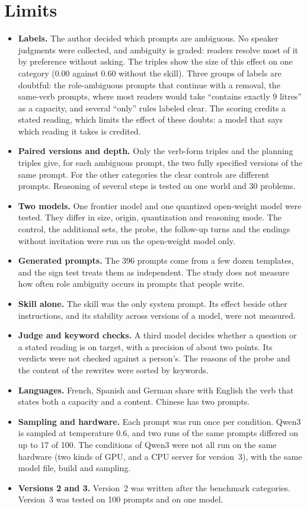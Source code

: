 \documentclass[11pt,a4paper]{article}
\begin{document}
\section{Limits}
\label{sec:limits}

\begin{itemize}\setlength\itemsep{2pt}
\item \textbf{Labels.} The author decided which prompts are ambiguous. No
speaker judgments were collected, and ambiguity is graded: readers resolve
most of it by preference without asking. The triples show the size of
this effect on one category (0.00 against 0.60 without the skill). Three
groups of labels are doubtful: the role-ambiguous prompts that continue
with a removal, the same-verb prompts, where most readers would take
``contains exactly 9 litres'' as a capacity, and several ``only'' rules
labeled clear. The scoring credits a stated reading, which limits the
effect of these doubts: a model that says which reading it takes is
credited.
\item \textbf{Paired versions and depth.} Only the verb-form triples and
the planning triples give, for each ambiguous prompt, the two fully
specified versions of the same prompt. For the other categories the clear
controls are different prompts. Reasoning of several steps is tested on
one world and 30 problems.
\item \textbf{Two models.} One frontier model and one quantized open-weight
model were tested. They differ in size, origin, quantization and
reasoning mode. The control, the additional sets, the probe, the
follow-up turns and the endings without invitation were run on the
open-weight model only.
\item \textbf{Generated prompts.} The 396 prompts come from a few dozen
templates, and the sign test treats them as independent. The study does
not measure how often role ambiguity occurs in prompts that people write.
\item \textbf{Skill alone.} The skill was the only system prompt. Its
effect beside other instructions, and its stability across versions of a
model, were not measured.
\item \textbf{Judge and keyword checks.} A third model decides whether a
question or a stated reading is on target, with a precision of about two
points. Its verdicts were not checked against a person's. The reasons of
the probe and the content of the rewrites were sorted by keywords.
\item \textbf{Languages.} French, Spanish and German share with English
the verb that states both a capacity and a content. Chinese has two
prompts.
\item \textbf{Sampling and hardware.} Each prompt was run once per
condition. Qwen3 is sampled at temperature 0.6, and two runs of the same
prompts differed on up to 17 of 100. The conditions of Qwen3 were not
all run on the same hardware (two kinds of GPU, and a CPU server for
version~3), with the same model file, build and sampling.
\item \textbf{Versions 2 and 3.} Version~2 was written after the benchmark
categories. Version~3 was tested on 100 prompts and on one model.
\end{itemize}
\end{document}
